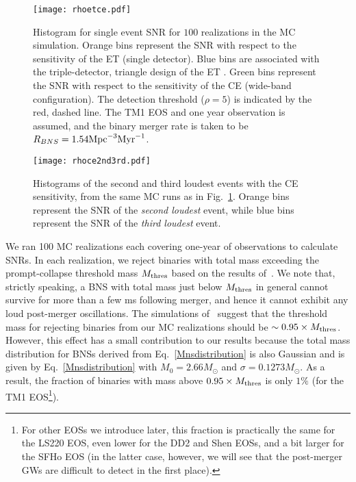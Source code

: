 \documentclass[prd,aps,floatfix,superscriptaddress,nofootinbib,twocolumn,10pt,English]{revtex4-1}
\begin{document}
\begin{figure}[tb]
\texttt{[image: rhoetce.pdf]}
\caption{Histogram for single event SNR for $100$ realizations in the
  MC simulation. Orange bins represent the SNR with respect
  to the sensitivity of the ET (single detector). Blue
  bins are associated with the triple-detector, triangle design of the
  ET \cite{regimbau2012mock}.  Green bins 
  represent
  the SNR with respect to the sensitivity of the CE
  (wide-band configuration). The detection threshold ($\rho=5$) is
  indicated by the red, dashed line.  The TM1 EOS and one year observation 
  is assumed, and the binary merger rate is taken
  to be $R_{BNS} = 1.54 {\rm Mpc}^{-3} {\rm Myr}^{-1}$.  }
\label{fig:plot1}
\end{figure}



\begin{figure}[tb]
\texttt{[image: rhoce2nd3rd.pdf]}
\caption{Histograms of the second and third loudest events with the CE sensitivity, from
 the same MC runs as in Fig.~\ref{fig:plot1}.  Orange bins represent
  the SNR of the {\it second loudest} event, while
  blue bins represent the SNR of the {\it third loudest}
  event.}
\label{fig:plot2}
\end{figure}

We ran 100 MC realizations each covering one-year of observations to
calculate SNRs. In each realization, we reject binaries with total
mass exceeding the prompt-collapse threshold mass $M_{\rm thres}$
based on the results of~\cite{bauswein2013prompt}. We note that,
strictly speaking, a BNS with total mass just below $M_{\rm thres}$ in
general cannot survive for more than a few ms following merger, and
hence it cannot exhibit any loud post-merger oscillations. The
simulations of~\cite{Shibata:2006nm} suggest that the threshold mass
for rejecting binaries from our MC realizations should be $\sim
0.95\times M_{\rm thres}$. However, this effect has a small
contribution to our results because the total mass distribution for
BNSs derived from Eq.~\eqref{Mnsdistribution} is also Gaussian and is
given by Eq.~\eqref{Mnsdistribution} with $M_{0} = 2.66M_\odot$ and
$\sigma=0.1273M_\odot$. As a result, the fraction of binaries with mass above
$0.95\times M_{\rm thres}$ is only $1\%$ (for the TM1 EOS\footnote{For other EOSs we introduce later, this
fraction is practically the same for the LS220 EOS, even lower for the
DD2 and Shen EOSs, and a bit larger for the SFHo EOS (in the latter
case, however, we will see that the post-merger GWs are difficult to
detect in the first place).}).
\end{document}

